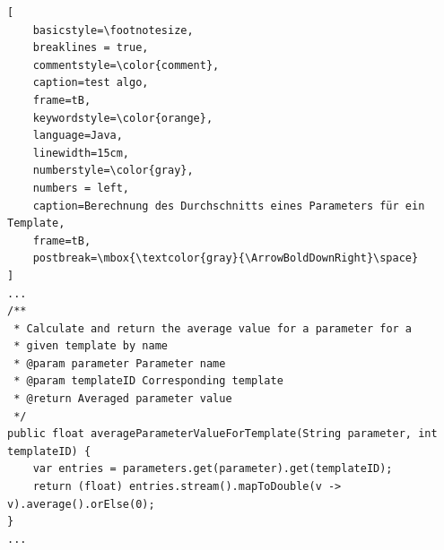 \begin{lstlisting}[
    basicstyle=\footnotesize,
    breaklines = true,
    commentstyle=\color{comment},
    caption=test algo,
    frame=tB,
    keywordstyle=\color{orange},
    language=Java,
    linewidth=15cm,
    numberstyle=\color{gray},
    numbers = left,
    caption=Berechnung des Durchschnitts eines Parameters für ein Template,
    frame=tB,
    postbreak=\mbox{\textcolor{gray}{\ArrowBoldDownRight}\space}
]
...
/**
 * Calculate and return the average value for a parameter for a
 * given template by name
 * @param parameter Parameter name
 * @param templateID Corresponding template
 * @return Averaged parameter value
 */
public float averageParameterValueForTemplate(String parameter, int templateID) {
    var entries = parameters.get(parameter).get(templateID);
    return (float) entries.stream().mapToDouble(v -> v).average().orElse(0);
}
...
\end{lstlisting}